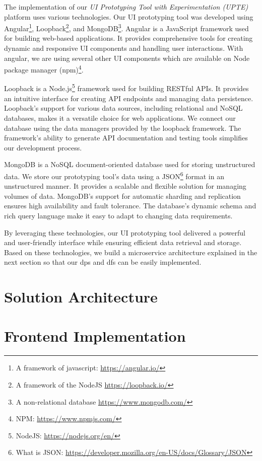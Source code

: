 The implementation of our \textit{UI Prototyping Tool with Experimentation (UPTE)} platform uses various technologies.
Our UI prototyping tool was developed using Angular\footnote{A framework of javascript: \url{https://angular.io/}}, Loopback\footnote{A framework of the NodeJS \url{https://loopback.io/}}, and MongoDB\footnote{A non-relational database \url{https://www.mongodb.com/}}.
Angular is a JavaScript framework used for building web-based applications.
It provides comprehensive tools for creating dynamic and responsive UI components and handling user interactions.
With angular, we are using several other UI components which are available on Node package manager (npm)\footnote{NPM: \url{https://www.npmjs.com/}}.

Loopback is a Node.js\footnote{NodeJS: \url{https://nodejs.org/en/}} framework used for building RESTful APIs. 
It provides an intuitive interface for creating API endpoints and managing data persistence. 
Loopback's support for various data sources, including relational and NoSQL databases, makes it a versatile choice for web applications. 
We connect our database using the data managers provided by the loopback framework.
The framework's ability to generate API documentation and testing tools simplifies our development process.

MongoDB is a NoSQL document-oriented database used for storing unstructured data. 
We store our prototyping tool's data using a JSON\footnote{What is JSON: \url{https://developer.mozilla.org/en-US/docs/Glossary/JSON}} format in an unstructured manner.
It provides a scalable and flexible solution for managing volumes of data. 
MongoDB's support for automatic sharding and replication ensures high availability and fault tolerance. 
The database's dynamic schema and rich query language make it easy to adapt to changing data requirements.

By leveraging these technologies, our UI prototyping tool delivered a powerful and user-friendly interface while ensuring efficient data retrieval and storage.
Based on these technologies, we build a microservice architecture explained in the next section so that our \ac{dp}s and \ac{df}s can be easily implemented. 

\section{Solution Architecture}
\label{implementation:section:architecture}

\section{Frontend Implementation}
\label{implementation:section:frontend}

